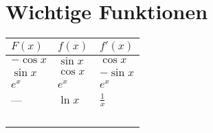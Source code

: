 \documentclass[10pt, a4paper, landscape, twocolumn]{scrartcl}
\begin{document}
	\section*{Wichtige Funktionen}
	\begin{center}
		\begin{tabular}{p{3cm}|p{3cm}|p{3cm}}
			$F(x)$ & $f(x)$ & $f'(x)$ \\ \hline\hline
			$-\cos{x}$ & $\sin{x}$ & $\cos{x}$ \\ \hline
			$\sin{x}$ & $\cos{x}$ & $-\sin{x}$ \\ \hline
			$e^x$ & $e^x$ & $e^x$ \\ \hline
			---	& $\ln{x}$ & $\frac{1}{x}$ \\ \hline
			&& \\ \hline
			&& \\ \hline
			&& \\ \hline
			&&
		\end{tabular}
	\end{center}
\end{document}
